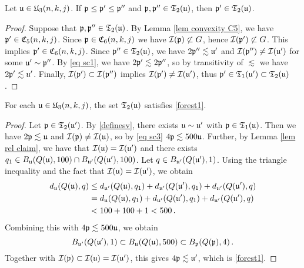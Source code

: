 \begin{lemma}
    \label{lem convex 6}
    Let $\mathfrak u \in \mathfrak U_3(n,k,j)$. If $\mathfrak p \le \mathfrak p' \le \mathfrak p''$ and $\mathfrak p, \mathfrak p'' \in \mathfrak{T}_2(\mathfrak u)$, then $\mathfrak p' \in \mathfrak{T}_2(\mathfrak u)$.
\end{lemma}

\begin{proof}
    Suppose that $\mathfrak p, \mathfrak p'' \in \mathfrak{T}_2(\mathfrak u)$. By Lemma \eqref{lem convexity C5}, we have $\mathfrak p' \in \mathfrak C_5(n,k,j)$. Since $\mathfrak p \in \mathfrak C_6(n,k,j)$ we have $\mathcal{I}(\mathfrak p) \not\subset G$, hence $\mathcal{I}(\mathfrak p') \not \subset G$. This implies $\mathfrak p' \in \mathfrak C_6(n,k,j)$. Since $\mathfrak p'' \in \mathfrak{T}_2(\mathfrak u)$, we have $2\mathfrak p'' \lesssim \mathfrak u'$ and $\mathcal{I}(\mathfrak p'')\ne\mathcal{I}(\mathfrak u')$ for some $\mathfrak u' \sim \mathfrak p''$. By \eqref{eq sc1}, we have $2\mathfrak p' \lesssim 2\mathfrak p''$, so by transitivity of $\lesssim$ we have $2\mathfrak p' \lesssim \mathfrak u'$. Finally, $\mathcal{I}(\mathfrak p') \subset \mathcal{I}(\mathfrak p'')$ implies $\mathcal{I}(\mathfrak p') \ne \mathcal{I}(\mathfrak u')$, thus $\mathfrak p' \in \mathfrak{T}_1(\mathfrak u') \subset \mathfrak{T}_2(\mathfrak u)$.
\end{proof}


\begin{lemma}
    \label{lem tree1 proof}
    For each $\mathfrak u\in \mathfrak U_3(n,k,j)$,
    the set $\mathfrak{T}_2(\mathfrak u)$
    satisfies \eqref{forest1}.
\end{lemma}
\begin{proof}
    Let $\mathfrak p \in \mathfrak{T}_2(\mathfrak u')$. By \eqref{definesv}, there exists $\mathfrak u \sim \mathfrak u'$ with $\mathfrak p \in \mathfrak{T}_1(\mathfrak u)$. Then we have $2\mathfrak p \lesssim \mathfrak u$ and $\mathcal{I}(\mathfrak p) \ne \mathcal{I}(\mathfrak u)$, so by \eqref{eq sc3} $4\mathfrak p \lesssim 500\mathfrak u$.
    Further, by Lemma \ref{lem rel claim}, we have that $\mathcal{I}(\mathfrak u) = \mathcal{I}(\mathfrak u')$ and there exists $q_1 \in B_{\mathfrak u}(Q(\mathfrak u),100) \cap B_{\mathfrak u'}(Q(\mathfrak u'),100)$.
    Let $q \in B_{\mathfrak u'}(Q(\mathfrak u'), 1)$.
    Using the triangle inequality and the fact that $\mathcal{I}(\mathfrak u)  =\mathcal{I}(\mathfrak u')$, we obtain
    \begin{align*}
        d_{\mathfrak u}(Q(\mathfrak u), q) &\le d_{\mathfrak u'}(Q(\mathfrak u), q_1) + d_{\mathfrak u'}(Q(\mathfrak u'), q_1) + d_{\mathfrak u'}(Q(\mathfrak u'), q)\\
        &= d_{\mathfrak u}(Q(\mathfrak u), q_1) + d_{\mathfrak u'}(Q(\mathfrak u'), q_1) + d_{\mathfrak u'}(Q(\mathfrak u'), q)\\
        &< 100 + 100 + 1 < 500\,.
    \end{align*}
    Combining this with $4\mathfrak p \lesssim 500\mathfrak u$, we obtain
    $$
        B_{\mathfrak u'}(Q(\mathfrak u'), 1) \subset B_{\mathfrak u}(Q(\mathfrak u), 500) \subset B_{\mathfrak p}(Q(\mathfrak p), 4)\,.
    $$
    Together with $\mathcal{I}(\mathfrak p) \subset \mathcal{I}(\mathfrak u) = \mathcal{I}(\mathfrak u')$, this gives $4\mathfrak p \lesssim \mathfrak u'$, which is \eqref{forest1}.
\end{proof}

